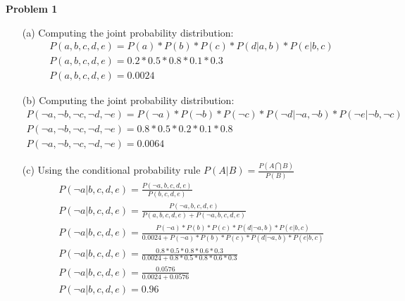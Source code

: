 \documentclass[11pt]{article}
\begin{document}
    \begin{center}
        \Large
        \textbf{Problem 1}
    \end{center}
    \normalsize
    \begin{enumerate}
        \item[(a)] Computing the joint probability distribution:
            \begin{gather*}
                P(a, b, c, d, e) = P(a)*P(b)*P(c)*P(d|a,b)*P(e|b,c)\\
                P(a, b, c, d, e) = 0.2*0.5*0.8*0.1*0.3\\
                P(a, b, c, d, e) = 0.0024
            \end{gather*}
        \item[(b)] Computing the joint probability distribution:
            \begin{gather*}
                P(\neg{a}, \neg{b}, \neg{c}, \neg{d}, \neg{e}) = P(\neg{a})*P(\neg{b})*P(\neg{c})*P(\neg{d}|\neg{a},\neg{b})*P(\neg{e}|\neg{b},\neg{c})\\
                P(\neg{a}, \neg{b}, \neg{c}, \neg{d}, \neg{e}) = 0.8*0.5*0.2*0.1*0.8\\
                P(\neg{a}, \neg{b}, \neg{c}, \neg{d}, \neg{e}) = 0.0064
            \end{gather*}
        \item[(c)] Using the conditional probability rule $P(A|B) = \frac{P(A\bigcap B)}{P(B)}$
            \begin{gather*}
                P(\neg{a} | b, c, d, e) = \frac{P(\neg{a}, b, c, d, e)}{P(b, c, d, e)}\\
                P(\neg{a} | b, c, d, e) = \frac{P(\neg{a}, b, c, d, e)}{P(a, b, c, d, e) + P(\neg{a}, b, c, d, e)}\\
                P(\neg{a} | b, c, d, e) = \frac{P(\neg{a})*P(b)*P(c)*P(d|\neg{a},b)*P(e|b,c)}{0.0024 + P(\neg{a})*P(b)*P(c)*P(d|\neg{a},b)*P(e|b,c)}\\
                P(\neg{a} | b, c, d, e) = \frac{0.8*0.5*0.8*0.6*0.3}{0.0024 + 0.8*0.5*0.8*0.6*0.3}\\
                P(\neg{a} | b, c, d, e) = \frac{0.0576}{0.0024 + 0.0576}\\
                P(\neg{a} | b, c, d, e) = 0.96
            \end{gather*}
    \end{enumerate}
\end{document}
